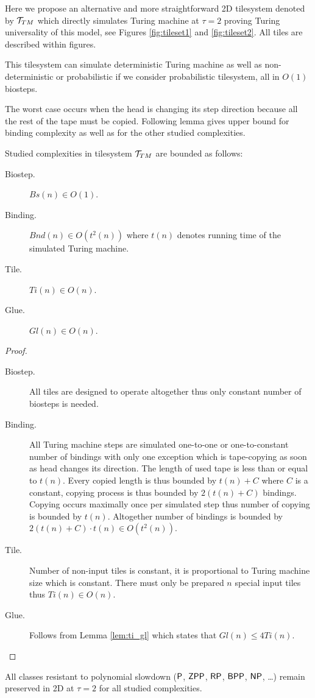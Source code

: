 	Here we propose an alternative and more straightforward 2D tilesystem denoted by ${\cal T}_{TM}$ which directly simulates Turing machine at $\tau=2$ proving Turing universality of this model, see Figures \ref{fig:tileset1} and \ref{fig:tileset2}. All tiles are described within figures.
	\begin{remark}
		This tilesystem can simulate deterministic Turing machine as well as non-deter\-ministic or probabilistic if we consider probabilistic tilesystem, all in $O(1)$ biosteps.
	\end{remark}
	The worst case occurs when the head is changing its step direction because all the rest of the tape must be copied. Following lemma gives upper bound for binding complexity as well as for the other studied complexities.
	\begin{lemma}
	\label{lem:TM_bound}
		Studied complexities in tilesystem ${\cal T}_{TM}$ are bounded as follows:
		\begin{description}
			\item[Biostep.] $Bs(n) \in O(1)$.
			\item[Binding.] $Bnd(n) \in O(t^2(n))$ where $t(n)$ denotes running time of the simulated Turing machine.
			\item[Tile.] $Ti(n) \in O(n)$.
			\item[Glue.] $Gl(n) \in O(n)$.
		\end{description}
	\end{lemma}
	\begin{proof}
		~
		\begin{description}
			\item[Biostep.] All tiles are designed to operate altogether thus only constant number of biosteps is needed.
			\item[Binding.] All Turing machine steps are simulated one-to-one or one-to-constant number of bindings with only one exception which is tape-copying as soon as head changes its direction. The length of %
			used tape is less than or equal to $t(n)$. Every copied length is thus bounded by $t(n) + C$ where $C$ is a constant, copying process is thus bounded by $2(t(n)+C)$ bindings. Copying occurs maximally once per simulated step thus number of copying is bounded by $t(n)$. Altogether number of bindings is bounded by $2(t(n)+C)\cdot t(n) \in O(t^2(n))$.
			\item[Tile.] Number of non-input tiles is constant, it is proportional to Turing machine size which is constant. There must only be prepared $n$ special input tiles thus $Ti(n) \in O(n)$.
			\item[Glue.] Follows from Lemma \ref{lem:ti_gl} which states that $Gl(n) \leq 4Ti(n)$.
		\end{description}
	\end{proof}
	\begin{cor}
	\label{cor:poly_resist}
		All classes resistant to polynomial slowdown ($\P$, $\ZPP$, $\RP$, $\BPP$, $\NP$, \ldots) remain preserved in 2D at $\tau = 2$ for all studied complexities.
	\end{cor}
	
